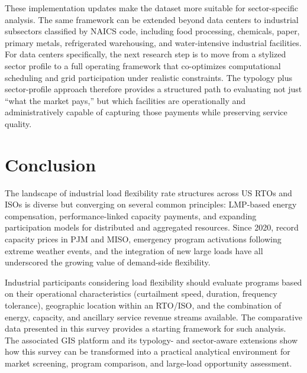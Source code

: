 \documentclass[12pt]{article}
\begin{document}
These implementation updates make the dataset more suitable for sector-specific analysis. The same framework can be extended beyond data centers to industrial subsectors classified by NAICS code, including food processing, chemicals, paper, primary metals, refrigerated warehousing, and water-intensive industrial facilities. For data centers specifically, the next research step is to move from a stylized sector profile to a full operating framework that co-optimizes computational scheduling and grid participation under realistic constraints. The typology plus sector-profile approach therefore provides a structured path to evaluating not just ``what the market pays,'' but which facilities are operationally and administratively capable of capturing those payments while preserving service quality.

\section{Conclusion}

The landscape of industrial load flexibility rate structures across US RTOs and ISOs is diverse but converging on several common principles: LMP-based energy compensation, performance-linked capacity payments, and expanding participation models for distributed and aggregated resources. Since 2020, record capacity prices in PJM and MISO, emergency program activations following extreme weather events, and the integration of new large loads have all underscored the growing value of demand-side flexibility.

Industrial participants considering load flexibility should evaluate programs based on their operational characteristics (curtailment speed, duration, frequency tolerance), geographic location within an RTO/ISO, and the combination of energy, capacity, and ancillary service revenue streams available. The comparative data presented in this survey provides a starting framework for such analysis. The associated GIS platform and its typology- and sector-aware extensions show how this survey can be transformed into a practical analytical environment for market screening, program comparison, and large-load opportunity assessment.
\end{document}
